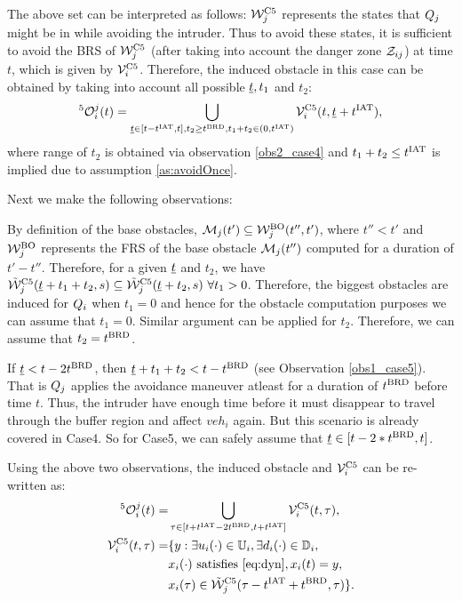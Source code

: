 The above set can be interpreted as follows: $\mathcal{W}_j^{\text{C5}}$ represents the states that $Q_j$ might be in while avoiding the intruder. Thus to avoid these states, it is sufficient to avoid the BRS of $\mathcal{W}_j^{\text{C5}}$ (after taking into account the danger zone $\mathcal{Z}_{ij}$) at time $t$, which is given by $\mathcal{V}^{\text{C5}}_{i}$. Therefore, the induced obstacle in this case can be obtained by taking into account all possible $\underline{t}, t_1$ and $t_2$:
\begin{equation} \label{eq:intruderObs_case5_alt1} 
^5\ioset_i^j(t) = \bigcup_{\tsa \in [t-\iat, t], t_2 \geq \brd, t_1 + t_2 \in (0, \iat)} \brs^{\text{C5}}_{i}(t, \tsa + \iat),
\end{equation}
where range of $t_2$ is obtained via observation \ref{obs2_case4} and $t_1 + t_2 \leq t^\text{IAT}$ is implied due to assumption \ref{as:avoidOnce}.

Next we make the following observations:
\begin{observation} \label{obs1_case5}
By definition of the base obstacles, $\mathcal{M}_j(t') \subseteq \mathcal{W}_j^{\text{BO}}(t'', t')$, where $t'' < t'$ and $\mathcal{W}_j^{\text{BO}}$ represents the FRS of the base obstacle $\mathcal{M}_j(t'')$ computed for a duration of $t' - t''$. Therefore, for a given $\underline{t}$ and $t_2$, we have $\tilde{\mathcal{W}}_j^{\text{C5}}(\underline{t}+t_1+t_2, s) \subseteq \tilde{\mathcal{W}}_j^{\text{C5}}(\underline{t}+t_2, s) ~\forall t_1 >0$. Therefore, the biggest obstacles are induced for $Q_i$ when $t_1 = 0$ and hence for the obstacle computation purposes we can assume that $t_1 = 0$. Similar argument can be applied for $t_2$. Therefore, we can assume that $t_2 = t^\text{BRD}$. 
\end{observation}

\begin{observation} \label{obs2_case5}
If $\underline{t} < t- 2t^\text{BRD}$, then $\underline{t} + t_1 + t_2 < t - t^\text{BRD}$ (see Observation \ref{obs1_case5}). That is $Q_j$ applies the avoidance maneuver atleast for a duration of $t^\text{BRD}$ before time $t$. Thus, the intruder have enough time before it must disappear to travel through the buffer region and affect $veh_i$ again. But this scenario is already covered in Case4. So for Case5, we can safely assume that $\underline{t} \in [t-2*t^\text{BRD}, t]$. 
\end{observation}
Using the above two observations, the induced obstacle and $\mathcal{V}^{\text{C5}}_{i}$ can be re-written as:
\begin{equation} \label{eq:intruderObs_case5} 
\begin{aligned}
^5\ioset_i^j(t) = & \bigcup_{\tau \in [t+\iat -2\brd, t+\iat]} \brs^{\text{C5}}_{i}(t, \tau),\\
\brs^{\text{C5}}_{i}(t, \tau) = & \{y: \exists \ctrl_i(\cdot) \in \cfset_i, \exists \dstb_i(\cdot) \in \dfset_i, \\
& \state_i(\cdot) \text{ satisfies \eqref{eq:dyn}}, \state_i(t) = y, \\
& \state_i(\tau) \in \tilde{\frs}_j^{\text{C5}}(\tau-\iat+\brd, \tau)\}.
\end{aligned}
\end{equation}